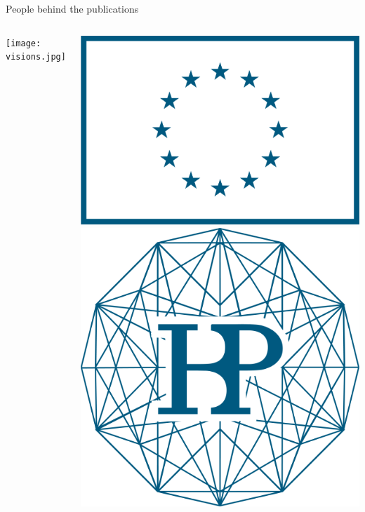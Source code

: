 \documentclass[10pt,aspectratio=169]{beamer}
\begin{document}
\begin{frame}{People behind the publications}

\begin{columns}
    \begin{center}
        
        \texttt{[image: visions.jpg]}
    \end{center}
        \vspace{0.05cm}
    \begin{center}
        \def \myHeight {0.12}
        \includegraphics[height=\myHeight\textheight]{logos/eu.png}
        \includegraphics[height=\myHeight\textheight]{logos/hbp.png}

\end{center}
\end{columns}
\end{frame}
\end{document}
